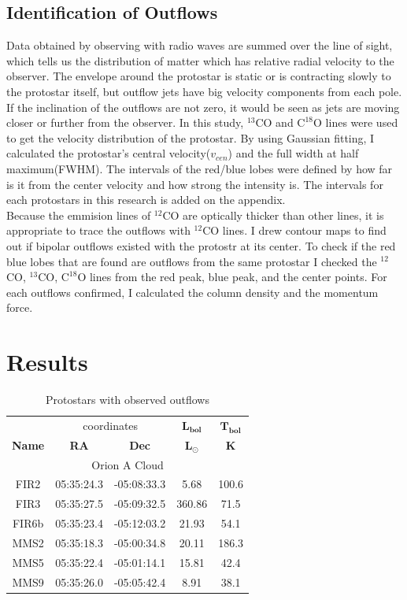 \documentclass[twoside,11pt]{gshs_thesis}
\begin{document}
\subsection{Identification of Outflows}
Data obtained by observing with radio waves are summed over the line of sight, which tells us the distribution of matter which has relative radial velocity to the observer. The envelope around the protostar is static or is contracting slowly to the protostar itself, but outflow jets have big velocity components from each pole. If the inclination of the outflows are not zero, it would be seen as jets are moving closer or further from the observer. In this study, $^{13}$CO and $\textrm{C}^{18}\textrm{O}$ lines were used to get the velocity distribution of the protostar. By using Gaussian fitting, I calculated the protostar’s central velocity($v_{cen}$) and the full width at half maximum(FWHM). The intervals of the red/blue lobes were defined by how far is it from the center velocity and how strong the intensity is. The intervals for each protostars in this research is added on the appendix. \\
Because the emmision lines of $^{12}$CO are optically thicker than other lines, it is appropriate to trace the outflows with $^{12}$CO lines. I drew contour maps to find out if bipolar outflows existed with the protostr at its center. To check if the red blue lobes that are found are outflows from the same protostar I checked the $^{12}$CO, $^{13}$CO, $\textrm{C}^{18}\textrm{O}$ lines from the red peak, blue peak, and the center points. For each outflows confirmed, I calculated the column density and the momentum force. \\

\newpage

\section{Results}

\begin{table}[h!]
	\begin{center}
		\begin{tabular}{c|c|c|c|c}
			\toprule
			& \multicolumn{2}{c|}{coordinates} & $\mathbf{L_{bol}}$ & $\mathbf{T_{bol}}$\\
			\textbf{Name} & \textbf{RA} & \textbf{Dec} & $\mathbf{L_{\odot}}$ & $\mathbf{K}$\\
			\midrule
			\multicolumn{5}{c}{Orion A Cloud}\\
			\midrule
			\centering
			FIR2 & 05:35:24.3 & -05:08:33.3 & 5.68 & 100.6\\
			FIR3 & 05:35:27.5 & -05:09:32.5 & 360.86 & 71.5\\
			FIR6b & 05:35:23.4 & -05:12:03.2 & 21.93 & 54.1\\
			MMS2 & 05:35:18.3 & -05:00:34.8 & 20.11 & 186.3\\
			MMS5 & 05:35:22.4 & -05:01:14.1 & 15.81 & 42.4\\
			MMS9 & 05:35:26.0 & -05:05:42.4 & 8.91 & 38.1\\
			\midrule
		\end{tabular}
	\end{center}
	\caption{Protostars with observed outflows}
\end{table}
\end{document}
